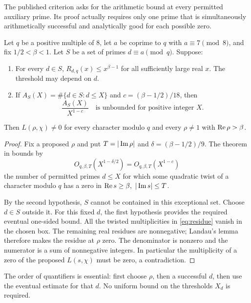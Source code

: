 The published criterion asks for the arithmetic bound at every permitted auxiliary prime. Its proof actually requires only one prime that is simultaneously arithmetically successful and analytically good for each possible zero.

\begin{theorem}\label{thm:subset}
Let \(q\) be a positive multiple of \(8\), let \(a\) be coprime to \(q\) with \(a\equiv7\pmod8\), and fix \(1/2<\beta<1\). Let \(S\) be a set of primes \(d\equiv a\pmod q\). Suppose:
\begin{enumerate}
\item For every \(d\in S\), \(R_{d,q}(x)\le x^{\beta-1}\) for all sufficiently large real \(x\). The threshold may depend on \(d\).
\item If \(A_S(X)=\#\{d\in S:d\le X\}\) and \(c=(\beta-1/2)/18\), then
\[
\frac{A_S(X)}{X^{1-c}}
\quad\text{is unbounded for positive integer \(X\).}
\]
\end{enumerate}
Then \(L(\rho,\chi)\ne0\) for every character modulo \(q\) and every \(\rho\ne1\) with \(\operatorname{Re}\rho>\beta\).
\end{theorem}

\begin{proof}
Fix a proposed \(\rho\) and put \(T=|\operatorname{Im}\rho|\) and \(\delta=(\beta-1/2)/9\). The theorem
 in  bounds by
\[
O_{q,\beta,T}\!\left(X^{1-\delta/2}\right)
=O_{q,\beta,T}(X^{1-c})
\]
the number of permitted primes \(d\le X\) for which some quadratic twist of a character modulo \(q\) has a zero in
\(\operatorname{Re} s\ge\beta,\ |\operatorname{Im} s|\le T\).

By the second hypothesis, \(S\) cannot be contained in this exceptional set. Choose \(d\in S\) outside it. For this fixed \(d\), the first hypothesis provides the required eventual one-sided bound. All the twisted multiplicities in \eqref{eq:residue} vanish in the chosen box. The remaining real residues are nonnegative; Landau's lemma therefore makes the residue at \(\rho\) zero. The denominator is nonzero and the numerator is a sum of nonnegative integers. In particular the multiplicity of a zero of the proposed \(L(s,\chi)\) must be zero, a contradiction.
\end{proof}

The order of quantifiers is essential: first choose \(\rho\), then a successful \(d\), then use the eventual estimate for that \(d\). No uniform bound on the thresholds \(X_d\) is required.

